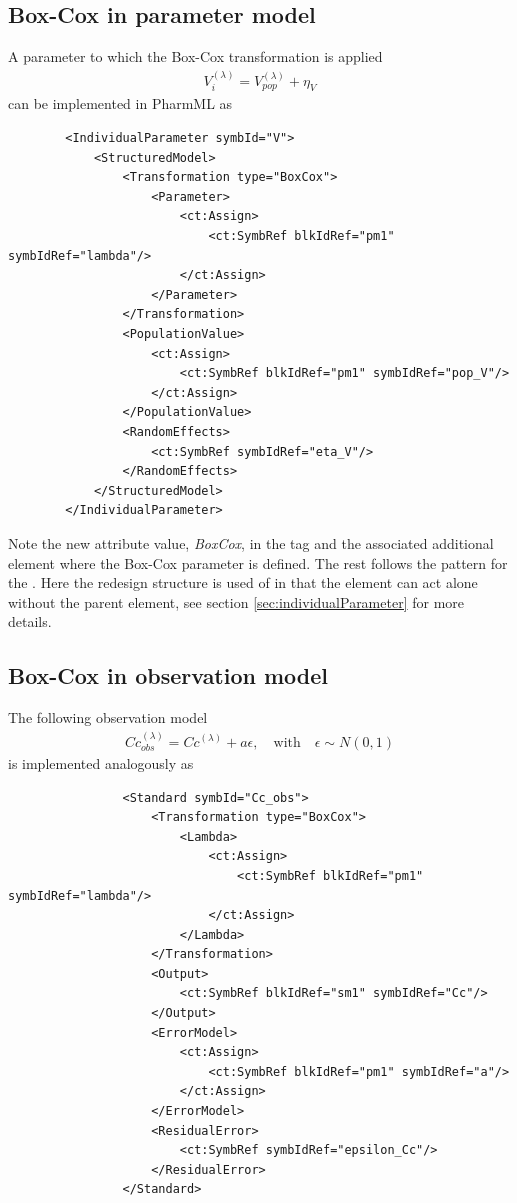 \subsection{Box-Cox in parameter model}
A parameter to which the Box-Cox transformation is applied 
\begin{align*}
        V_{i}^{(\lambda)} = V_{pop}^{(\lambda)} + \eta_V
\end{align*}
can be implemented in PharmML as
\lstset{language=XML}
\begin{lstlisting}
        <IndividualParameter symbId="V">
            <StructuredModel>
                <Transformation type="BoxCox">
                    <Parameter>
                        <ct:Assign>
                            <ct:SymbRef blkIdRef="pm1" symbIdRef="lambda"/>
                        </ct:Assign>
                    </Parameter>
                </Transformation>
                <PopulationValue>
                    <ct:Assign>
                        <ct:SymbRef blkIdRef="pm1" symbIdRef="pop_V"/>
                    </ct:Assign>
                </PopulationValue>
                <RandomEffects>
                    <ct:SymbRef symbIdRef="eta_V"/>
                </RandomEffects>
            </StructuredModel>
        </IndividualParameter>
 \end{lstlisting}
Note the new  attribute value, \emph{BoxCox}, in the  
tag and the associated additional element  where the Box-Cox 
parameter is defined. The rest follows the pattern for the .
Here the redesign structure is used of  in that the 
 element can act alone without the  
parent element, see section \ref{sec:individualParameter}
for more details.

\subsection{Box-Cox in observation model}
The following observation model 
\begin{align*}
        Cc_{obs}^{(\lambda)} = Cc^{(\lambda)} + a \epsilon, \quad \text{with} \quad \epsilon \sim N(0,1)
\end{align*}
is implemented analogously as 
\lstset{language=XML}
\begin{lstlisting}
                <Standard symbId="Cc_obs">
                    <Transformation type="BoxCox">
                        <Lambda>
                            <ct:Assign>
                                <ct:SymbRef blkIdRef="pm1" symbIdRef="lambda"/>
                            </ct:Assign>
                        </Lambda>
                    </Transformation>
                    <Output>
                        <ct:SymbRef blkIdRef="sm1" symbIdRef="Cc"/>
                    </Output>
                    <ErrorModel>
                        <ct:Assign>
                            <ct:SymbRef blkIdRef="pm1" symbIdRef="a"/>
                        </ct:Assign>
                    </ErrorModel>
                    <ResidualError>
                        <ct:SymbRef symbIdRef="epsilon_Cc"/>
                    </ResidualError>
                </Standard>
\end{lstlisting}



